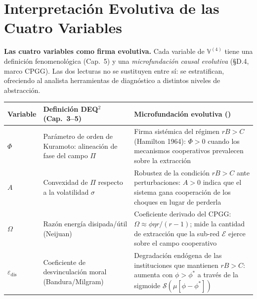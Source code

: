 \section{Interpretaci\'{o}n Evolutiva de las Cuatro Variables}\label{interpretazione-evolutiva-quattro-variables}

\Hypoth{} \textbf{Las cuatro variables como firma evolutiva.} Cada
variable de \(\mathbb{V}^{(4)}\) tiene una definici\'{o}n
fenomenol\'{o}gica (Cap.~5) y una \emph{microfundaci\'{o}n causal
evolutiva} (§D.4, marco CPGG). Las dos lecturas no se sustituyen entre
s\'{i}: se estratifican, ofreciendo al analista herramientas de
diagn\'{o}stico a distintos niveles de abstracci\'{o}n.

{\def\LTcaptype{none}
{\small\begin{longtable}[]{@{}
  >{\raggedright\arraybackslash}p{}
  >{\raggedright\arraybackslash}p{}
  >{\raggedright\arraybackslash}p{}@{}}
\toprule\noalign{}
\begin{minipage}[b]{\linewidth}\raggedright
Variable
\end{minipage} & \begin{minipage}[b]{\linewidth}\raggedright
Definici\'{o}n DEQ$^2$ (Cap.~3--5)
\end{minipage} & \begin{minipage}[b]{\linewidth}\raggedright
Microfundaci\'{o}n evolutiva (\Hypoth{})
\end{minipage} \\
\midrule\noalign{}
\endhead
\bottomrule\noalign{}
\endlastfoot
\(\Phi\) & Par\'{a}metro de orden de Kuramoto: alineaci\'{o}n de fase del
campo \(\Pi\) & Firma sist\'{e}mica del r\'{e}gimen \(rB > C\) (Hamilton
1964): \(\Phi > 0\) cuando los mecanismos cooperativos prevalecen sobre la
extracci\'{o}n \\ \addlinespace
\(A\) & Convexidad de \(\Pi\) respecto a la volatilidad \(\sigma\) &
Robustez de la condici\'{o}n \(rB > C\) ante perturbaciones: \(A > 0\)
indica que el sistema gana cooperaci\'{o}n de los choques en lugar de
perderla \\ \addlinespace
\(\Omega\) & Raz\'{o}n energ\'{i}a disipada/\'{u}til (Neijuan) &
Coeficiente derivado del CPGG: \(\Omega \approx \phi\eta r/(r-1)\); mide
la cantidad de extracci\'{o}n que la sub-red \(\mathcal{E}\) ejerce sobre
el campo cooperativo \\ \addlinespace
\(\varepsilon_{\text{dis}}\) & Coeficiente de desvinculaci\'{o}n moral
(Bandura/Milgram) & Degradaci\'{o}n end\'{o}gena de las instituciones que
mantienen \(rB > C\): aumenta con \(\phi > \phi^*\) a trav\'{e}s de la
sigmoide \(\mathcal{S}(\mu[\phi - \phi^*])\) \\
\end{longtable}}
}

